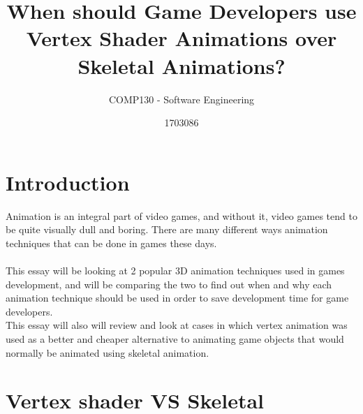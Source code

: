 \documentclass{scrartcl}
\title{When should Game Developers use Vertex Shader Animations over Skeletal Animations?}
\subtitle{COMP130 - Software Engineering}
\author{1703086}
\begin{document}
\maketitle


\section{Introduction}
Animation is an integral part of video games, and without it, video games tend to be quite visually dull and boring. There are  many different ways animation techniques that can be done in games these days.
\\~\\
This essay will be looking at 2 popular 3D animation techniques used in games development, and will be comparing the two to find out when and why each animation technique should be used in order to save development time for game developers.\\
This essay will also will review and look at cases in which vertex animation was used as a better and cheaper alternative to animating game objects that would normally be animated using skeletal animation.





\section{Vertex shader VS Skeletal}
\end{document}
